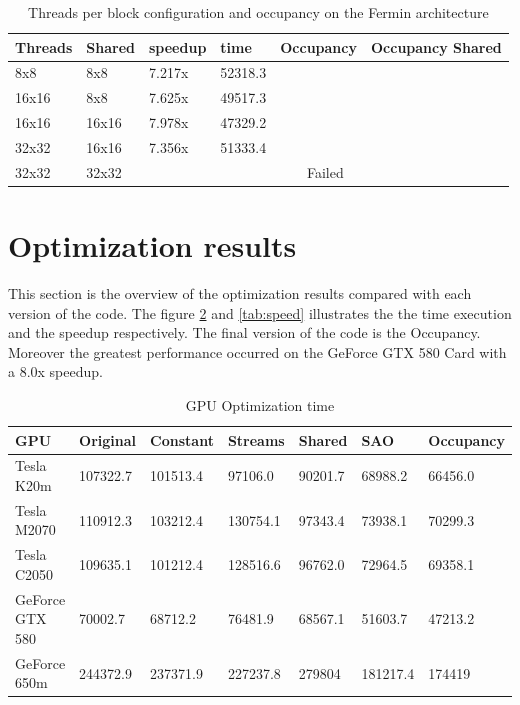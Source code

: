 \begin{table}[h]
\centering
  \begin{tabular} { | l | l | l | l | l | l | }
    \hline
    Threads & Shared & speedup & time & Occupancy & Occupancy Shared \\
    \hline
     8x8 &  8x8 & 7.217x & 52318.3  &  & \\
    \hline
     16x16 & 8x8 & 7.625x & 49517.3 &  & \\
    \hline
    16x16 & 16x16 & 7.978x & 47329.2 &  & \\
    \hline
    32x32 & 16x16 & 7.356x & 51333.4 &  & \\
    \hline
    32x32 & 32x32 & \multicolumn{4}{|c|}{Failed}\\
    \hline
  \end{tabular}
  \caption{Threads per block configuration and occupancy on the Fermin architecture}
  \label{tab:threads}
  \end{table}


\section{Optimization results}

This section is the overview of the optimization results compared with each version of the code. The figure \ref{tab:time} and \ref{tab:speed} illustrates the the time execution and the speedup respectively. The final version of the code is the Occupancy. Moreover the greatest performance occurred on the GeForce GTX 580 Card with a 8.0x speedup.

\begin{table}[h]
\centering
  \begin{tabular} { |  l  |  l | l  |  l  | l | l | l |}
    \hline
    GPU & Original & Constant & Streams & Shared & SAO & Occupancy \\
    \hline
    Tesla K20m & 107322.7 & 101513.4 & 97106.0 & 90201.7 & 68988.2 & 66456.0\\
   \hline
    Tesla M2070 & 110912.3 & 103212.4 & 130754.1 & 97343.4 & 73938.1 & 70299.3\\
    \hline
    Tesla C2050 & 109635.1 & 101212.4 & 128516.6 & 96762.0 & 72964.5 & 69358.1\\
   \hline
    GeForce GTX 580 & 70002.7 & 68712.2 & 76481.9 & 68567.1 & 51603.7 & 47213.2\\
   \hline
    GeForce 650m & 244372.9 & 237371.9 & 227237.8 & 279804 & 181217.4 & 174419\\
   \hline
  \end{tabular}
    \caption{GPU Optimization time}
  \label{tab:time}
  \end{table}
  
